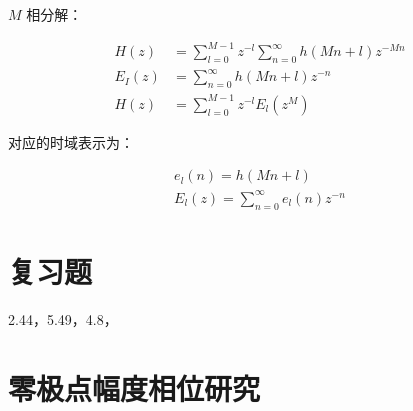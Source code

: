 \documentclass[cn,11pt,chinese,black,simple]{elegantbook}
\begin{document}
\(M\) 相分解：

\[\begin{aligned}
    H(z) &=\sum_{l=0}^{M-1} z^{-l} \sum_{n=0}^{\infty} h(M n+l) z^{-M n} \\
    E_{I}(z) &=\sum_{n=0}^{\infty} h(M n+l) z^{-n} \\
    H(z) &=\sum_{l=0}^{M-1} z^{-l} E_{l}\left(z^{M}\right)
\end{aligned}\]

对应的时域表示为：

\[
\begin{array}{l}
e_{l}(n)=h(M n+l) \\
E_{l}(z)=\sum_{n=0}^{\infty} e_{l}(n) z^{-n}
\end{array}
\]



\chapter{复习题}

2.44，5.49，4.8，

\appendix

\chapter{零极点幅度相位研究}



\let\chapname\undefined
\ifx\mainclass\undefined
\end{document}
